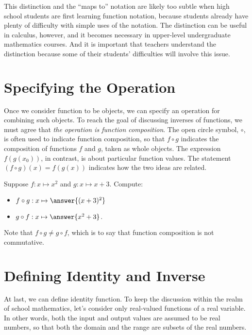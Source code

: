 \documentclass{ximera}
\begin{document}
This distinction and the ``maps to'' notation are likely too subtle when high school students are first learning function notation, because students already have plenty of difficulty with simple uses of the notation.  The distinction can be useful in calculus, however, and it becomes necessary in upper-level undergraduate mathematics courses.  And it is important that teachers understand the distinction because some of their students' difficulties will involve this issue.


\section*{Specifying the Operation}
Once we consider function to be objects, we can specify an operation for combining such objects.  To reach the goal of discussing inverses of functions, we must agree that \emph{the operation is function composition}.  The open circle symbol, $\circ$, is often used to indicate function composition, so that $f\circ g$  indicates the composition of functions $f$ and $g$, taken as whole objects.  The expression $f(g(x_0))$, in contrast, is about particular function values.  The statement $(f\circ g)(x) = f(g(x))$ indicates how the two ideas are related.  

\begin{question}
Suppose $f: x\mapsto x^2$ and $g: x\mapsto x+3$.  Compute: 
\begin{itemize}
\item $f\circ g: x\mapsto \answer{(x+3)^2}$ 
\item $g\circ f: x\mapsto \answer{x^2+3}$. 
\end{itemize}

\begin{feedback}[correct]
Note that $f\circ g \neq g\circ f$, which is to say that function composition is not commutative.  
\end{feedback}
\end{question}

\section*{Defining Identity and Inverse}
At last, we can define identity function.  To keep the discussion within the realm of school mathematics, let's consider only real-valued functions of a real variable.  In other words, both the input and output values are assumed to be real numbers, so that both the domain and the range are subsets of the real numbers.  
\end{document}
